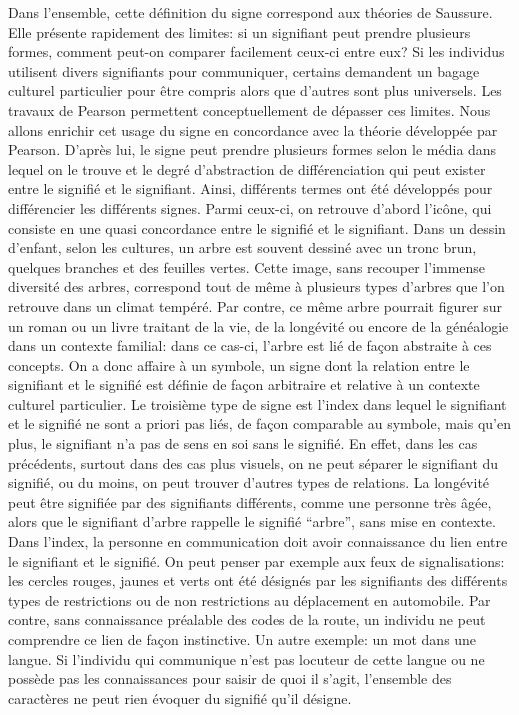 Dans l'ensemble, cette définition du signe correspond aux théories de Saussure.
Elle présente rapidement des limites: si un signifiant peut prendre plusieurs formes, comment peut-on comparer facilement ceux-ci entre eux?
Si les individus utilisent divers signifiants pour communiquer, certains demandent un bagage culturel particulier pour être compris alors que d'autres sont plus universels.
Les travaux de Pearson permettent conceptuellement de dépasser ces limites.
Nous allons enrichir cet usage du signe en concordance avec la théorie développée par Pearson.
D'après lui, le signe peut prendre plusieurs formes selon le média dans lequel on le trouve et le degré d'abstraction de différenciation qui peut exister entre le signifié et le signifiant.
Ainsi, différents termes ont été développés pour différencier les différents signes.
Parmi ceux-ci, on retrouve d'abord l'icône, qui consiste en une quasi concordance entre le signifié et le signifiant.
Dans un dessin d'enfant, selon les cultures, un arbre est souvent dessiné avec un tronc brun, quelques branches et des feuilles vertes.
Cette image, sans recouper l'immense diversité des arbres, correspond tout de même à plusieurs types d'arbres que l'on retrouve dans un climat tempéré.
Par contre, ce même arbre pourrait figurer sur un roman ou un livre traitant de la vie, de la longévité ou encore de la généalogie dans un contexte familial: dans ce cas-ci, l'arbre est lié de façon abstraite à ces concepts.
On a donc affaire à un symbole, un signe dont la relation entre le signifiant et le signifié est définie de façon arbitraire et relative à un contexte culturel particulier.
Le troisième type de signe est l'index dans lequel le signifiant et le signifié ne sont a priori pas liés, de façon comparable au symbole, mais qu'en plus, le signifiant n'a pas de sens en soi sans le signifié.
En effet, dans les cas précédents, surtout dans des cas plus visuels, on ne peut séparer le signifiant du signifié, ou du moins, on peut trouver d'autres types de relations.
La longévité peut être signifiée par des signifiants différents, comme une personne très âgée, alors que le signifiant d'arbre rappelle le signifié \enquote{arbre}, sans mise en contexte.
Dans l'index, la personne en communication doit avoir connaissance du lien entre le signifiant et le signifié.
On peut penser par exemple aux feux de signalisations: les cercles rouges, jaunes et verts ont été désignés par les signifiants des différents types de restrictions ou de non restrictions au déplacement en automobile.
Par contre, sans connaissance préalable des codes de la route, un individu ne peut comprendre ce lien de façon instinctive.
Un autre exemple: un mot dans une langue.
Si l'individu qui communique n'est pas locuteur de cette langue ou ne possède pas les connaissances pour saisir de quoi il s'agit, l'ensemble des caractères ne peut rien évoquer du signifié qu'il désigne.

